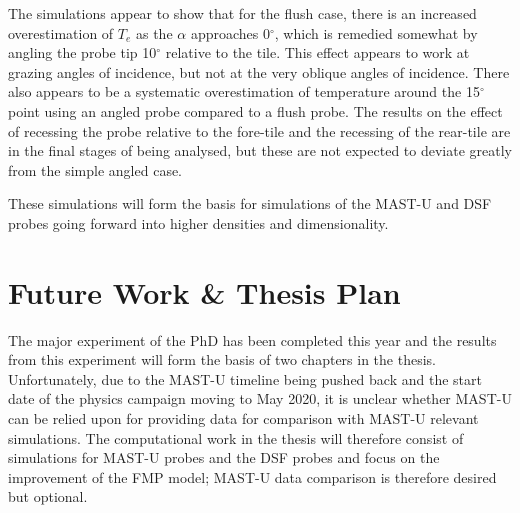 \documentclass[a4paper, 12pt]{article} %
\begin{document}
	The simulations appear to show that for the flush case, there is an increased overestimation of $T_e$ as the $\alpha$ approaches 0$^{\circ}$, which is remedied somewhat by angling the probe tip 10$^{\circ}$ relative to the tile. 
	This effect appears to work at grazing angles of incidence, but not at the very oblique angles of incidence.
	There also appears to be a systematic overestimation of temperature around the 15$^{\circ}$ point using an angled probe compared to a flush probe. 
	The results on the effect of recessing the probe relative to the fore-tile and the recessing of the rear-tile are in the final stages of being analysed, but these are not expected to deviate greatly from the simple angled case.
	
    These simulations will form the basis for simulations of the MAST-U and DSF probes going forward into higher densities and dimensionality. 


\section{\label{sec:phd}Future Work \& Thesis Plan}
    The major experiment of the PhD has been completed this year and the results from this experiment will form the basis of two chapters in the thesis. 
    Unfortunately, due to the MAST-U timeline being pushed back and the start date of the physics campaign moving to May 2020, it is unclear whether MAST-U can be relied upon for providing data for comparison with MAST-U relevant simulations. 
    The computational work in the thesis will therefore consist of simulations for MAST-U probes and the DSF probes and focus on the improvement of the FMP model; MAST-U data comparison is therefore desired but optional. 
    
\end{document}
